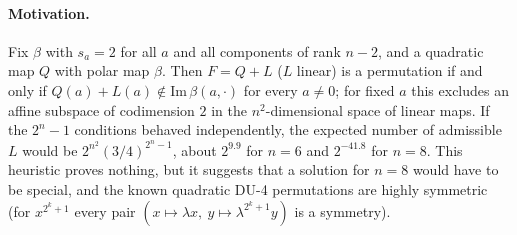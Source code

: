 \paragraph{Motivation.} Fix $\beta$ with $s_a=2$ for all $a$ and all components of rank $n-2$,
and a quadratic map $Q$ with polar map $\beta$. Then $F=Q+L$ ($L$ linear) is a permutation if
and only if $Q(a)+L(a)\notin\mathrm{Im}\,\beta(a,\cdot)$ for every $a\neq0$; for fixed $a$ this
excludes an affine subspace of codimension $2$ in the $n^2$-dimensional space of linear maps.
If the $2^n-1$ conditions behaved independently, the expected number of admissible $L$ would be
$2^{n^2}(3/4)^{2^n-1}$, about $2^{9.9}$ for $n=6$ and $2^{-41.8}$ for $n=8$. This heuristic
proves nothing, but it suggests that a solution for $n=8$ would have to be special, and the
known quadratic DU-4 permutations are highly symmetric (for $x^{2^k+1}$ every pair
$(x\mapsto\lambda x,\ y\mapsto\lambda^{2^k+1}y)$ is a symmetry).

